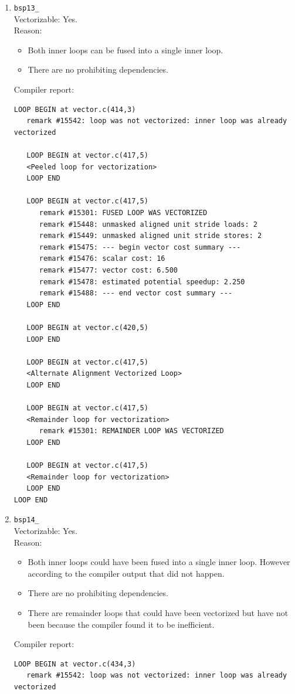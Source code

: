 \documentclass[11pt]{article}
\begin{document}
\begin{enumerate}
\item \texttt{bsp13\_}\\
Vectorizable: Yes.\\
Reason:
\begin{itemize}
\item Both inner loops can be fused into a single inner loop.
\item There are no prohibiting dependencies.
\end{itemize}
Compiler report:
\begin{lstlisting}
LOOP BEGIN at vector.c(414,3)
   remark #15542: loop was not vectorized: inner loop was already vectorized

   LOOP BEGIN at vector.c(417,5)
   <Peeled loop for vectorization>
   LOOP END

   LOOP BEGIN at vector.c(417,5)
      remark #15301: FUSED LOOP WAS VECTORIZED
      remark #15448: unmasked aligned unit stride loads: 2 
      remark #15449: unmasked aligned unit stride stores: 2 
      remark #15475: --- begin vector cost summary ---
      remark #15476: scalar cost: 16 
      remark #15477: vector cost: 6.500 
      remark #15478: estimated potential speedup: 2.250 
      remark #15488: --- end vector cost summary ---
   LOOP END

   LOOP BEGIN at vector.c(420,5)
   LOOP END

   LOOP BEGIN at vector.c(417,5)
   <Alternate Alignment Vectorized Loop>
   LOOP END

   LOOP BEGIN at vector.c(417,5)
   <Remainder loop for vectorization>
      remark #15301: REMAINDER LOOP WAS VECTORIZED
   LOOP END

   LOOP BEGIN at vector.c(417,5)
   <Remainder loop for vectorization>
   LOOP END
LOOP END
\end{lstlisting}

\item \texttt{bsp14\_}\\
Vectorizable: Yes.\\
Reason:
\begin{itemize}
\item Both inner loops could have been fused into a single inner loop. However according to the compiler output that did not happen.
\item There are no prohibiting dependencies.
\item There are remainder loops that could have been vectorized but have not been because the compiler found it to be inefficient.
\end{itemize}
Compiler report:
\begin{lstlisting}
LOOP BEGIN at vector.c(434,3)
   remark #15542: loop was not vectorized: inner loop was already vectorized


\end{lstlisting}
\end{enumerate}
\end{document}
